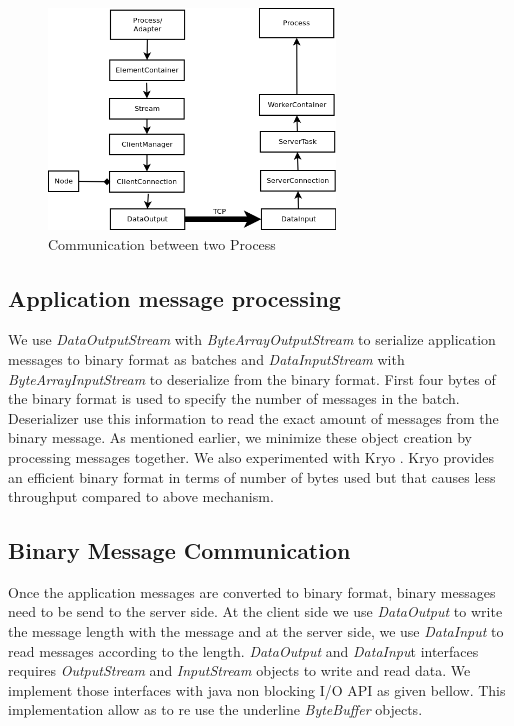 \begin{figure}[!t]
        \centering
        \includegraphics[width=3.0in]{interprocess.png}
        \caption{Communication between two Process}
        \label{interprocess}
\end{figure}

\subsection{Application message processing}
We use \textit{DataOutputStream} with \textit{ByteArrayOutputStream} to serialize application messages to binary format as batches and \textit{DataInputStream} with \textit{ByteArrayInputStream} to deserialize from the binary format. First four bytes of the binary format is used to specify the number of messages in the batch.  Deserializer use this information to read the exact amount of messages from the binary message. As mentioned earlier, we minimize these object creation by processing messages together. We also experimented with Kryo \cite{kryo}. Kryo provides an efficient binary format in terms of number of bytes used but that causes less throughput compared to above mechanism. 

\subsection{Binary Message Communication}
Once the application messages are converted to binary format, binary messages need to be send to the server side. At the client side we use \textit{DataOutput} to write the message length with the message and at the server side, we use \textit{DataInput} to read messages according to the length. \textit{DataOutput} and \textit{DataInpu}t interfaces requires \textit{OutputStream} and \textit{InputStream} objects to write and read data. We implement those interfaces with java non blocking I/O API as given bellow. This implementation allow as to re use the underline \textit{ByteBuffer} objects. 

